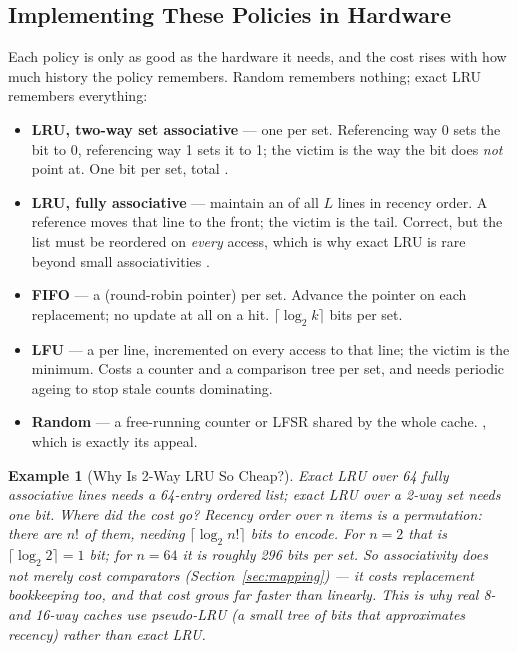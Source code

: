 \documentclass[11pt]{article}
\newtheorem{example}{Example}[section]
\begin{document}
\subsection{Implementing These Policies in Hardware}

Each policy is only as good as the hardware it needs, and the cost rises with how much history the policy remembers. Random remembers nothing; exact LRU remembers everything:

\begin{itemize}
  \item \textbf{LRU, two-way set associative} --- one  per set. Referencing way 0 sets the bit to 0, referencing way 1 sets it to 1; the victim is the way the bit does \emph{not} point at. One bit per set, total \cite[\S5.2, PDF p.~203]{Stallings2015_computer_organization}.
  \item \textbf{LRU, fully associative} --- maintain an  of all $L$ lines in recency order. A reference moves that line to the front; the victim is the tail. Correct, but the list must be reordered on \emph{every} access, which is why exact LRU is rare beyond small associativities \cite[\S5.2, PDF p.~203]{Stallings2015_computer_organization}.
  \item \textbf{FIFO} --- a  (round-robin pointer) per set. Advance the pointer on each replacement; no update at all on a hit. $\lceil \log_2 k \rceil$ bits per set.
  \item \textbf{LFU} --- a  per line, incremented on every access to that line; the victim is the minimum. Costs a counter and a comparison tree per set, and needs periodic ageing to stop stale counts dominating.
  \item \textbf{Random} --- a free-running counter or LFSR shared by the whole cache. , which is exactly its appeal.
\end{itemize}

\begin{example}[Why Is 2-Way LRU So Cheap?]
\label{ex:2way-lru}
Exact LRU over 64 fully associative lines needs a 64-entry ordered list; exact LRU over a 2-way set needs \emph{one bit}. Where did the cost go? Recency order over $n$ items is a \emph{permutation}: there are $n!$ of them, needing $\lceil \log_2 n! \rceil$ bits to encode. For $n = 2$ that is $\lceil \log_2 2 \rceil = 1$ bit; for $n = 64$ it is roughly \emph{296 bits per set}. So associativity does not merely cost comparators (Section~\ref{sec:mapping}) --- it costs \emph{replacement bookkeeping too}, and that cost grows far faster than linearly. This is why real 8- and 16-way caches use \emph{pseudo}-LRU (a small tree of bits that approximates recency) rather than exact LRU.
\end{example}
\end{document}

